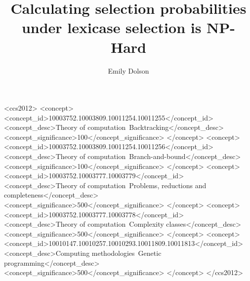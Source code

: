 \documentclass[sigconf]{acmart}
\begin{document}
\title{Calculating selection probabilities under lexicase selection is NP-Hard}


\author{Emily Dolson}

\renewcommand{\shortauthors}{Dolson}

\begin{abstract}
\end{abstract}


\begin{CCSXML}
<ccs2012>
   <concept>
       <concept_id>10003752.10003809.10011254.10011255</concept_id>
       <concept_desc>Theory of computation~Backtracking</concept_desc>
       <concept_significance>100</concept_significance>
       </concept>
   <concept>
       <concept_id>10003752.10003809.10011254.10011256</concept_id>
       <concept_desc>Theory of computation~Branch-and-bound</concept_desc>
       <concept_significance>100</concept_significance>
       </concept>
   <concept>
       <concept_id>10003752.10003777.10003779</concept_id>
       <concept_desc>Theory of computation~Problems, reductions and completeness</concept_desc>
       <concept_significance>500</concept_significance>
       </concept>
   <concept>
       <concept_id>10003752.10003777.10003778</concept_id>
       <concept_desc>Theory of computation~Complexity classes</concept_desc>
       <concept_significance>500</concept_significance>
       </concept>
   <concept>
       <concept_id>10010147.10010257.10010293.10011809.10011813</concept_id>
       <concept_desc>Computing methodologies~Genetic programming</concept_desc>
       <concept_significance>500</concept_significance>
       </concept>
 </ccs2012>
\end{CCSXML}
\end{document}
